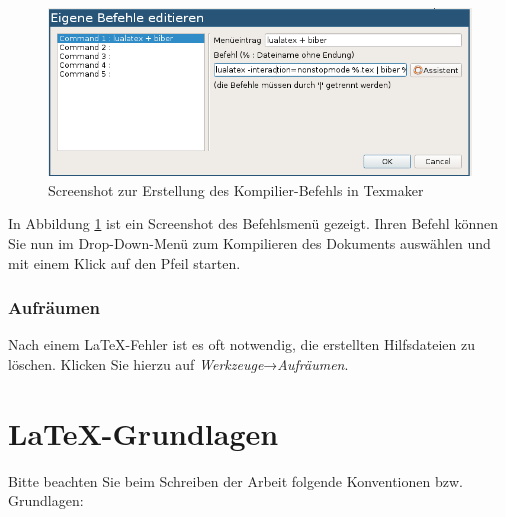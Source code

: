\begin{figure}
    \centering
    \includegraphics[width=12cm]{Plots/texmaker.png}
    \caption{Screenshot zur Erstellung des Kompilier-Befehls in Texmaker}
    \label{fig:texmaker}
\end{figure}


In Abbildung \ref{fig:texmaker} ist ein Screenshot des Befehlsmenü gezeigt. Ihren Befehl können Sie nun im Drop-Down-Menü zum 
Kompilieren des Dokuments auswählen und mit einem Klick auf den Pfeil starten.

\subsubsection{Aufräumen}

Nach einem \LaTeX-Fehler ist es oft notwendig, die erstellten Hilfsdateien zu löschen.
Klicken Sie hierzu auf \emph{Werkzeuge}→\emph{Aufräumen}.


\section{\LaTeX-Grundlagen}

Bitte beachten Sie beim Schreiben der Arbeit folgende Konventionen bzw. Grundlagen:

